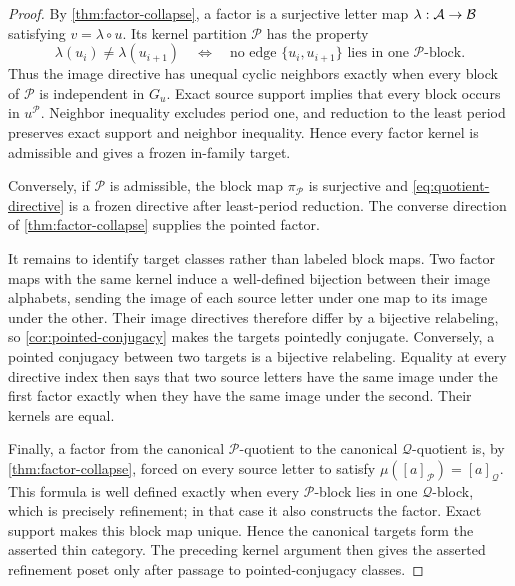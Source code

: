 \begin{proof}
  By \cref{thm:factor-collapse}, a factor is a surjective letter map
  $\lambda:\mathcal A\to\mathcal B$ satisfying $v=\lambda\circ u$.  Its kernel
  partition $\mathcal P$ has the property
  \begin{equation}
    \lambda(u_i)\neq\lambda(u_{i+1})
    \quad\Longleftrightarrow\quad
    \text{no edge $\{u_i,u_{i+1}\}$ lies in one $\mathcal P$-block}.
    \label{eq:kernel-admissible}
  \end{equation}
  Thus the image directive has unequal cyclic neighbors exactly when every
  block of $\mathcal P$ is independent in $G_u$.  Exact source support
  implies that every block occurs in $u^{\mathcal P}$.  Neighbor
  inequality excludes period one, and reduction to the least period
  preserves exact support and neighbor inequality.  Hence every factor
  kernel is admissible and gives a frozen in-family target.

  Conversely, if $\mathcal P$ is admissible, the block map
  $\pi_{\mathcal P}$ is surjective and \cref{eq:quotient-directive} is a
  frozen directive after least-period reduction.  The converse direction
  of \cref{thm:factor-collapse} supplies the pointed factor.

  It remains to identify target classes rather than labeled block maps.
  Two factor maps with the same kernel induce a well-defined bijection
  between their image alphabets, sending the image of each source letter
  under one map to its image under the other.  Their image directives
  therefore differ by a bijective relabeling, so
  \cref{cor:pointed-conjugacy} makes the targets pointedly conjugate.
  Conversely, a pointed conjugacy between two targets is a bijective
  relabeling.  Equality at every directive index then says that two source
  letters have the same image under the first factor exactly when they have
  the same image under the second.  Their kernels are equal.

  Finally, a factor from the canonical $\mathcal P$-quotient to the
  canonical $\mathcal Q$-quotient is, by
  \cref{thm:factor-collapse}, forced on every source letter to satisfy
  $\mu([a]_{\mathcal P})=[a]_{\mathcal Q}$.  This formula is well defined
  exactly when every $\mathcal P$-block lies in one $\mathcal Q$-block,
  which is precisely refinement; in that case it also constructs the
  factor.  Exact support makes this block map unique.  Hence the canonical
  targets form the asserted thin category.  The preceding kernel argument
  then gives the asserted refinement poset only after passage to
  pointed-conjugacy classes.
\end{proof}


